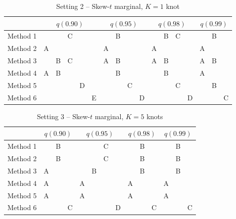 \documentclass[11pt]{article}
\begin{document}
\begin{table}[htbp]
  \centering
  \caption{Setting 2 -- Skew-$t$ marginal, $K = 1$ knot}
  \label{tbl:st1sim}
  \begin{tabular}{|l|ccccc|cccc|cccc|ccc|}
    \cline{2-17}
    \multicolumn{1}{c}{} & \multicolumn{5}{|c}{$q(0.90)$} & \multicolumn{4}{|c}{$q(0.95)$} & \multicolumn{4}{|c}{$q(0.98)$} & \multicolumn{3}{|c|}{$q(0.99)$} \\
    \hline
    Method 1 &   &   & C &   &   &   & B &   &   &   & B & C &   &   & B &   \\
    \hline
    Method 2 & A &   &   &   &   & A &   &   &   & A &   &   &   & A &   &   \\
    \hline
    Method 3 &   & B & C &   &   & A & B &   &   & A & B &   &   & A & B &   \\
    \hline
    Method 4 & A & B &   &   &   &   & B &   &   &   & B &   &   & A &   &   \\
    \hline
    Method 5 &   &   &   & D &   &   &   & C &   &   &   & C &   &   & B &   \\
    \hline
    Method 6 &   &   &   &   & E &   &   &   & D &   &   &   & D &   &   & C \\
    \hline
  \end{tabular}
\end{table}

\begin{table}[htbp]
  \centering
  \caption{Setting 3 -- Skew-$t$ marginal, $K = 5$ knots}
  \label{tbl:st5sim}
  \begin{tabular}{|l|ccc|cccc|ccc|ccc|}
    \cline{2-14}
    \multicolumn{1}{c}{} & \multicolumn{3}{|c}{$q(0.90)$} & \multicolumn{4}{|c}{$q(0.95)$} & \multicolumn{3}{|c}{$q(0.98)$} & \multicolumn{3}{|c|}{$q(0.99)$} \\
    \hline
    Method 1 &   & B &   &   &   & C &   &   & B &   &   & B &   \\
    \hline
    Method 2 &   & B &   &   &   & C &   &   & B &   &   & B &   \\
    \hline
    Method 3 & A &   &   &   & B &   &   &   & B &   &   & B &   \\
    \hline
    Method 4 & A &   &   & A &   &   &   & A &   &   & A &   &   \\
    \hline
    Method 5 & A &   &   & A &   &   &   & A &   &   & A &   &   \\
    \hline
    Method 6 &   &   & C &   &   &   & D &   &   & C &   &   & C \\
    \hline
  \end{tabular}
\end{table}
\end{document}
